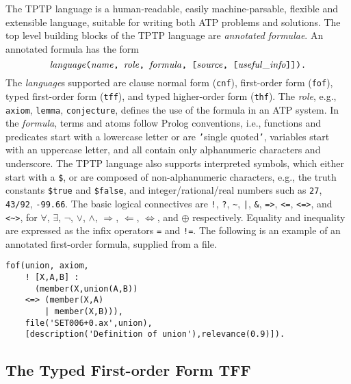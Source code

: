 The TPTP language is a human-readable, easily machine-parsable, flexible and
extensible language, suitable for writing both ATP problems and solutions.
The top level building blocks of the TPTP language are {\em annotated 
formulae}.
An annotated formula has the form $$\mathit{language}\text{\tt(}\mathit{name}\text{\tt, }\mathit{role}\text{\tt, }\mathit{formula}\text{\tt, [}\mathit{source}\text{\tt, [}\mathit{useful\_info}\text{\tt]]).}$$
The {\em language}s supported are clause normal form (\lstinline'cnf'),
first-order form (\lstinline'fof'), typed first-order form (\lstinline'tff'), and
typed higher-order form (\lstinline'thf').
The {\em role}, e.g., \lstinline'axiom', \lstinline'lemma', \lstinline'conjecture',
defines the use of the formula in an ATP system.
In the {\em formula}, terms and atoms follow Prolog conventions, i.e.,
functions and predicates start with a lowercase letter or are {\tt '}single
quoted{\tt '}, variables start with an uppercase letter, and all
contain only alphanumeric characters and underscore.
The TPTP language also supports interpreted symbols, which either start with a
\lstinline'$', or are composed of non-alphanumeric characters, e.g., the truth
constants \lstinline'$true' and \lstinline'$false', and integer/rational/real
numbers such as \lstinline'27', \lstinline'43/92', \lstinline'-99.66'.
The basic logical connectives are
\lstinline'!', \lstinline'?', \lstinline'~', \lstinline'|', \lstinline'&', \lstinline'=>', \lstinline'<=',
\lstinline'<=>', and \lstinline'<~>',
for
$\forall$, $\exists$, $\neg$, $\vee$, $\wedge$, $\Rightarrow$, $\Leftarrow$,
$\Leftrightarrow$, and $\oplus$ respectively.
Equality and inequality are expressed as the infix operators \lstinline'=' and
\lstinline'!='.
The following is an example of an annotated first-order formula, supplied from a file.
\begin{lstlisting}[language=tptp]
fof(union, axiom,
    ! [X,A,B] :
      (member(X,union(A,B))
    <=> (member(X,A)
        | member(X,B))),
    file('SET006+0.ax',union),
    [description('Definition of union'),relevance(0.9)]).
\end{lstlisting}

\subsection{The Typed First-order Form TFF}
\label{sec:tfx/TFF}

